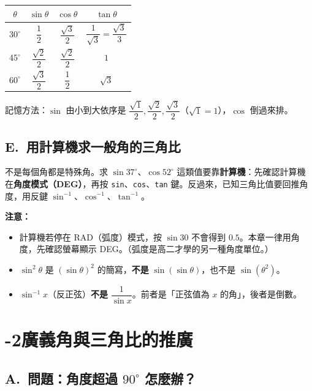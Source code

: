 \documentclass[11pt]{article}
\begin{document}
\begin{center}
\renewcommand{\arraystretch}{1.6}
\begin{tabular}{c|c|c|c}
\hline
$\theta$ & $\sin\theta$ & $\cos\theta$ & $\tan\theta$ \\
\hline
$30^\circ$ & $\dfrac12$ & $\dfrac{\sqrt3}{2}$ & $\dfrac{1}{\sqrt3}=\dfrac{\sqrt3}{3}$ \\
$45^\circ$ & $\dfrac{\sqrt2}{2}$ & $\dfrac{\sqrt2}{2}$ & $1$ \\
$60^\circ$ & $\dfrac{\sqrt3}{2}$ & $\dfrac12$ & $\sqrt3$ \\
\hline
\end{tabular}
\end{center}

記憶方法：$\sin$ 由小到大依序是 $\dfrac{\sqrt1}{2},\dfrac{\sqrt2}{2},\dfrac{\sqrt3}{2}$（$\sqrt1=1$），$\cos$ 倒過來排。

\subsection*{\sffamily E.\ 用計算機求一般角的三角比}

不是每個角都是特殊角。求 $\sin 37^\circ$、$\cos 52^\circ$ 這類值要靠\textbf{計算機}：先確認計算機在\textbf{角度模式（DEG）}，再按 \texttt{sin}、\texttt{cos}、\texttt{tan} 鍵。反過來，已知三角比值要回推角度，用反鍵 $\sin^{-1}$、$\cos^{-1}$、$\tan^{-1}$。

\textbf{注意：}
\begin{itemize}\setlength{\itemsep}{1pt}
\item 計算機若停在 RAD（弧度）模式，按 $\sin 30$ 不會得到 $0.5$。本章一律用角度，先確認螢幕顯示 DEG。（弧度是高二才學的另一種角度單位。）
\item $\sin^2\theta$ 是 $(\sin\theta)^2$ 的簡寫，\textbf{不是} $\sin(\sin\theta)$，也不是 $\sin(\theta^2)$。
\item $\sin^{-1}x$（反正弦）\textbf{不是} $\dfrac{1}{\sin x}$。前者是「正弦值為 $x$ 的角」，後者是倒數。
\end{itemize}

\section*{-2\quad 廣義角與三角比的推廣}

\subsection*{\sffamily A.\ 問題：角度超過 $90^\circ$ 怎麼辦？}
\end{document}
